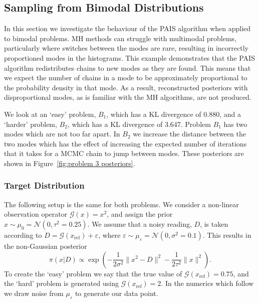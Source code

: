 \documentclass[final]{siamltex}
\newcommand{\G}{\mathcal{G}}
\newcommand{\N}{\mathcal{N}}
\begin{document}
\subsection{Sampling from Bimodal Distributions}

In this section we investigate the behaviour of the PAIS algorithm
when applied to bimodal problems. MH methods can
struggle with multimodal problems, particularly where switches between
the modes are rare, resulting in incorrectly proportioned modes in the
histograms. This example demonstrates that the PAIS algorithm redistributes 
chains to new modes as they are found. This means that we expect the number of chains in a mode to be
approximately proportional to the probability density in that mode. As a result, reconstructed posteriors with disproportional modes, as is familiar with the MH algorithms, are not produced.

We look at an `easy' problem, $B_1$, which has a KL divergence of
0.880, and a `harder' problem, $B_2$, which has a KL divergence of
3.647. Problem $B_1$ has two modes which are not too far apart. In
$B_2$ we increase the distance between the two modes which has the
effect of increasing the expected number of iterations that it takes
for a MCMC chain to jump between modes. These posteriors are shown in Figure~\ref{fig:problem 3 posteriors}.

\subsubsection{Target Distribution} \label{sec:tar}

The following setup is the same for both problems. We consider a
non-linear observation operator $\G(x) = x^2$, and assign the prior
$x \sim \mu_0 = \N(0, \tau^2=0.25)$. We assume that a noisy reading,
$D$, is taken according to $D = \G(x_\text{ref}) + \varepsilon$, where
$\varepsilon \sim \mu_\varepsilon = \N(0, \sigma^2 = 0.1)$. This results
in the non-Gaussian posterior
\[
	\pi(x|D) \propto \exp\left(-\frac{1}{2\sigma^2}\|x^2 - D\|^2 - \frac{1}{2\tau^2}\|x\|^2\right).
\]
To create the `easy' problem we say that the true value of
$\G(x_\text{ref}) = 0.75$, and the `hard' problem is generated using
$\G(x_\text{ref}) = 2$. In the numerics which follow we draw noise from
$\mu_\varepsilon$ to generate our data point.
\end{document}
